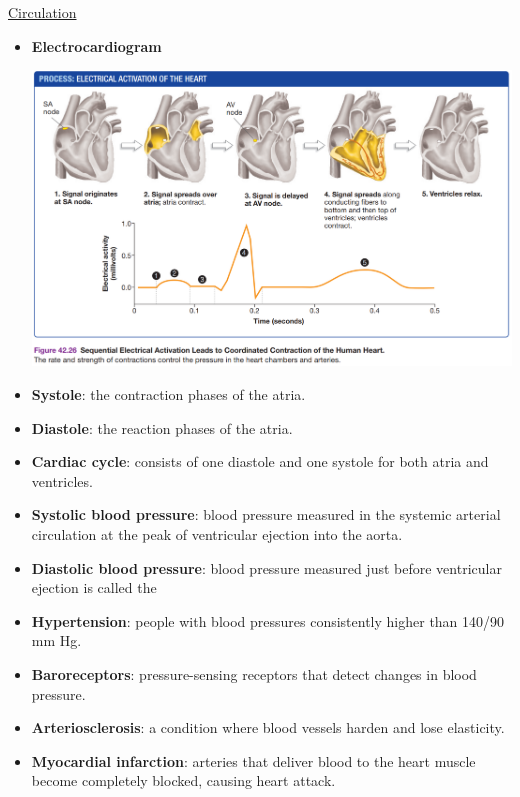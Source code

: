 \documentclass[12pt,letterpaper]{article}
\begin{document}
\begin{secbox}{\hyperlink{42}{Circulation}}
{\begin{itemize}
        \item \textbf{Electrocardiogram}
        \begin{center}
            \includegraphics[scale=0.4]{images/ekg.png}    
        \end{center}
        \vspace{-18pt}
        \item \textbf{Systole}: the contraction phases of the atria.
        \item \textbf{Diastole}: the reaction phases of the atria.
        \item \textbf{Cardiac cycle}: consists of one
        diastole and one systole for both atria and ventricles.
        \item \textbf{Systolic blood pressure}: blood pressure measured
        in the systemic arterial circulation at the peak of ventricular ejection into the aorta.
        \item \textbf{Diastolic blood pressure}: blood
        pressure measured just before ventricular ejection is called the
        \item \textbf{Hypertension}: people with blood pressures consistently higher than 140/90 mm Hg.
        \item \textbf{Baroreceptors}: pressure-sensing receptors that detect changes in blood pressure.
        \item \textbf{Arteriosclerosis}: a condition where blood vessels harden and lose elasticity.
        \item \textbf{Myocardial infarction}: arteries that deliver blood to the heart muscle become completely blocked, causing heart attack. 
    \end{itemize}


}
\end{secbox}
\end{document}
